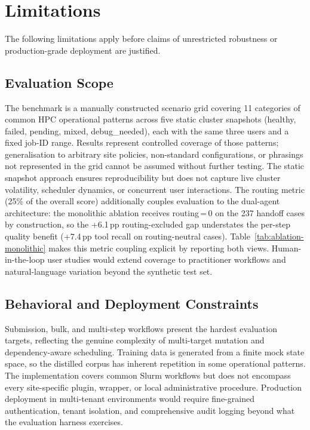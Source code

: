 \section{Limitations}
\label{sec:limitations}

The following limitations apply before claims of unrestricted robustness or production-grade deployment are justified.

\subsection{Evaluation Scope}

The benchmark is a manually constructed scenario grid covering 11 categories of common HPC operational patterns across five static cluster snapshots (healthy, failed, pending, mixed, debug\_needed), each with the same three users and a fixed job-ID range. Results represent controlled coverage of those patterns; generalisation to arbitrary site policies, non-standard configurations, or phrasings not represented in the grid cannot be assumed without further testing. The static snapshot approach ensures reproducibility but does not capture live cluster volatility, scheduler dynamics, or concurrent user interactions. The routing metric (25\% of the overall score) additionally couples evaluation to the dual-agent architecture: the monolithic ablation receives routing\,=\,0 on the 237 handoff cases by construction, so the +6.1\,pp routing-excluded gap understates the per-step quality benefit (+7.4\,pp tool recall on routing-neutral cases). Table~\ref{tab:ablation-monolithic} makes this metric coupling explicit by reporting both views. Human-in-the-loop user studies would extend coverage to practitioner workflows and natural-language variation beyond the synthetic test set.

\subsection{Behavioral and Deployment Constraints}

Submission, bulk, and multi-step workflows present the hardest evaluation targets, reflecting the genuine complexity of multi-target mutation and dependency-aware scheduling. Training data is generated from a finite mock state space, so the distilled corpus has inherent repetition in some operational patterns. The implementation covers common Slurm workflows but does not encompass every site-specific plugin, wrapper, or local administrative procedure. Production deployment in multi-tenant environments would require fine-grained authentication, tenant isolation, and comprehensive audit logging beyond what the evaluation harness exercises.

